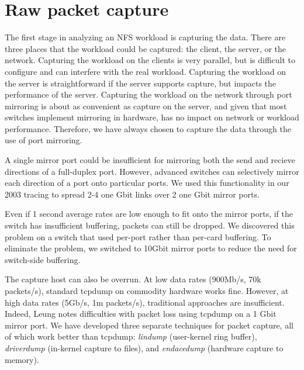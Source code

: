 \section{Raw packet capture}
\label{sec:capture}

The first stage in analyzing an NFS workload is capturing the data.
There are three places that the workload could be captured: the
client, the server, or the network.  Capturing the workload on the
clients is very parallel, but is difficult to configure and can
interfere with the real workload.  Capturing the workload on the
server is straightforward if the server supports capture, 
but impacts the performance of the
server.  Capturing the workload on the network through port mirroring
is about as convenient as capture on the server, and given that most
switches implement mirroring in hardware, has no impact on network or
workload performance.  
Therefore, we have always chosen to capture the
data through the use of port mirroring.

A single mirror port could be insufficient for mirroring both the send
and recieve directions of a full-duplex port.  However, advanced
switches can selectively mirror each direction of a port onto
particular ports.  We used this functionality in our 2003 tracing to
spread 2-4 one Gbit links over 2 one Gbit mirror ports.

Even if 1 second average rates are low enough to fit onto the mirror
ports, if the switch has insufficient buffering, packets can still be
dropped. We discovered this problem on a switch that used per-port
rather than per-card buffering.  To eliminate the problem, we switched
to 10Gbit mirror ports to reduce the need for switch-side buffering.

The capture host can also be overrun. At low data rates (900Mb/s,
70k packets/s), standard tcpdump on commodity hardware works fine.
However, at high data rates (5Gb/s, 1m packets/s),
traditional approaches are insufficient. Indeed,
Leung\cite{LeungUsenix08} notes
difficulties with packet loss using tcpdump on a 1 Gbit mirror port.
We have developed three separate techniques for packet capture, all of
which work better than tcpdump: {\it lindump} (user-kernel ring
buffer), {\it driverdump} (in-kernel capture to files), and {\it
endacedump} (hardware capture to memory).  

